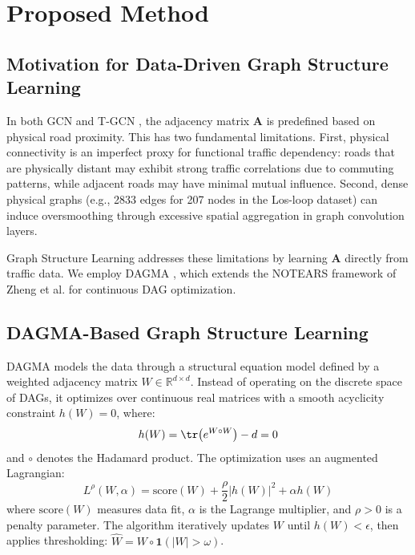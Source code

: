 \section{Proposed Method}\label{sec:method}

\subsection{Motivation for Data-Driven Graph Structure Learning}

In both GCN \citep{kipf2017semi} and T-GCN \citep{zhao2019t}, the adjacency matrix $\mathbf{A}$ is predefined based on physical road proximity. This has two fundamental limitations. First, physical connectivity is an imperfect proxy for functional traffic dependency: roads that are physically distant may exhibit strong traffic correlations due to commuting patterns, while adjacent roads may have minimal mutual influence. Second, dense physical graphs (e.g., 2833 edges for 207 nodes in the Los-loop dataset) can induce oversmoothing through excessive spatial aggregation in graph convolution layers.

Graph Structure Learning addresses these limitations by learning $\mathbf{A}$ directly from traffic data. We employ DAGMA \citep{Bello2024DAGMA}, which extends the NOTEARS framework of Zheng et al. \citep{zheng2018dags} for continuous DAG optimization.

\subsection{DAGMA-Based Graph Structure Learning}

DAGMA models the data through a structural equation model defined by a weighted adjacency matrix $W \in \mathbb{R}^{d \times d}$. Instead of operating on the discrete space of DAGs, it optimizes over continuous real matrices with a smooth acyclicity constraint $h(W) = 0$, where:
\begin{equation}
h(W) = \tr\big(e^{W \circ W}\big) - d = 0
\end{equation}
and $\circ$ denotes the Hadamard product. The optimization uses an augmented Lagrangian:
\begin{equation}
L^\rho(W, \alpha) = \text{score}(W) + \frac{\rho}{2}|h(W)|^2 + \alpha h(W)
\end{equation}
where $\text{score}(W)$ measures data fit, $\alpha$ is the Lagrange multiplier, and $\rho > 0$ is a penalty parameter. The algorithm iteratively updates $W$ until $h(W) < \epsilon$, then applies thresholding: $\hat{W} = W \circ \mathbf{1}(|W| > \omega)$.

